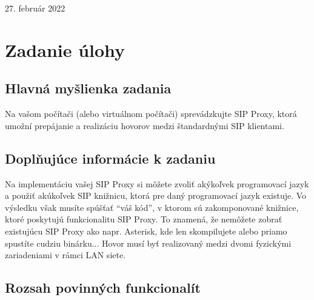 \begin{titlepage}
	
	\vfill\vfill\vfill %
	
	{\large27. február 2022} %
	
	
	 
	
	\vfill %

\end{titlepage}

\newpage
\tableofcontents
\newpage
\section{Zadanie úlohy}

\subsection{Hlavná myšlienka zadania}
Na vašom počítači (alebo virtuálnom počítači) sprevádzkujte SIP Proxy, ktorá umožní prepájanie a realizáciu hovorov medzi štandardnými SIP klientami.

\subsection{Doplňujúce informácie k zadaniu}
Na implementáciu vašej SIP Proxy si môžete zvoliť akýkoľvek programovací jazyk a použiť akúkoľvek SIP knižnicu, ktorá pre daný programovací jazyk existuje. Vo výsledku však musíte spúšťať “váš kód”, v ktorom sú zakomponované knižnice, ktoré poskytujú funkcionalitu SIP Proxy. To znamená, že nemôžete zobrať existujúcu SIP Proxy ako napr. Asterisk, kde len skompilujete alebo priamo spustíte cudziu binárku... Hovor musí byť realizovaný medzi dvomi fyzickými zariadeniami v rámci LAN siete.

\subsection{Rozsah povinných funkcionalít}

